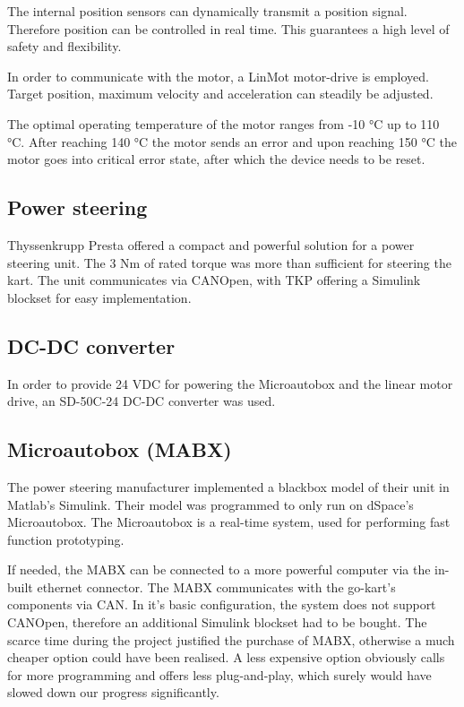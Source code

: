 The internal position sensors can dynamically transmit a position signal. Therefore position can be controlled in real time. This guarantees a high level of safety and flexibility. 

In order to communicate with the motor, a LinMot motor-drive is employed. Target position, maximum velocity and acceleration can steadily be adjusted.

The optimal operating temperature of the motor ranges from -10 °C up to 110 °C. After reaching 140 °C the motor sends an error and upon reaching 150 °C the motor goes into critical error state, after which the device needs to be reset.


\subsection{Power steering}
Thyssenkrupp Presta offered a compact and powerful solution for a power steering unit. The 3 Nm of rated torque was more than sufficient for steering the kart. The unit communicates via CANOpen, with TKP offering a Simulink blockset for easy implementation. 

\subsection{DC-DC converter}
In order to provide 24 VDC for powering the Microautobox and the linear motor drive, an SD-50C-24 DC-DC converter was used.

\subsection{Microautobox (MABX)}
The power steering manufacturer implemented a blackbox model of their unit in Matlab's Simulink. Their model was programmed to only run on dSpace's Microautobox. The Microautobox is a real-time system, used for performing fast function prototyping.

If needed, the MABX can be connected to a more powerful computer via the in-built ethernet connector. The MABX communicates with the go-kart's components via CAN. In it's basic configuration, the system does not support CANOpen, therefore an additional Simulink blockset had to be bought. The scarce time during the project justified the purchase of MABX, otherwise a much cheaper option could have been realised. A less expensive option obviously calls for more programming and offers less plug-and-play, which surely would have slowed down our progress significantly. 

